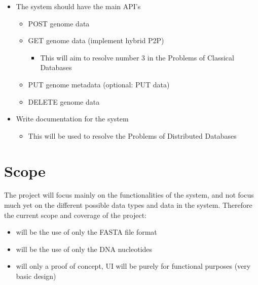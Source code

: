 \documentclass{article}
\begin{document}
\begin{itemize}
    \item The system should have the main API’s
    \begin{itemize}
        \item POST genome data
        \item GET genome data (implement hybrid P2P)
        \begin{itemize}
            \item This will aim to resolve number 3 in the Problems of Classical Databases
        \end{itemize}
        \item PUT genome metadata (optional: PUT data)
        \item DELETE genome data
    \end{itemize}
    \item Write documentation for the system
    \begin{itemize}
        \item This will be used to resolve the Problems of Distributed Databases
    \end{itemize}
\end{itemize}




\section{Scope}

The project will focus mainly on the functionalities of the system, and not focus much yet on the different possible data types and data in the system. Therefore the current scope and coverage of the project:


\begin{itemize}
    \item will be the use of only the FASTA file format
    \item will be the use of only the DNA nucleotides
    \item will only a proof of concept, UI will be purely for functional purposes
(very basic design)
\end{itemize}
\end{document}
